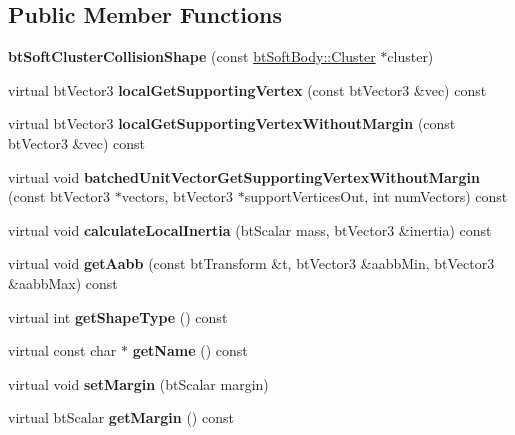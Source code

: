 \subsection*{Public Member Functions}
\begin{DoxyCompactItemize}
\item 
\mbox{\label{classbtSoftClusterCollisionShape_a13945afba7d058ce5838dcc19a5239fb}} 
{\bfseries bt\+Soft\+Cluster\+Collision\+Shape} (const \hyperlink{structbtSoftBody_1_1Cluster}{bt\+Soft\+Body\+::\+Cluster} $\ast$cluster)
\item 
\mbox{\label{classbtSoftClusterCollisionShape_abc8c1607229965355a14808cdb7b6dfa}} 
virtual bt\+Vector3 {\bfseries local\+Get\+Supporting\+Vertex} (const bt\+Vector3 \&vec) const
\item 
\mbox{\label{classbtSoftClusterCollisionShape_a465058b0fd68751b081a06949db51db5}} 
virtual bt\+Vector3 {\bfseries local\+Get\+Supporting\+Vertex\+Without\+Margin} (const bt\+Vector3 \&vec) const
\item 
\mbox{\label{classbtSoftClusterCollisionShape_afc3eb712e569104728cd6ec429e85ea4}} 
virtual void {\bfseries batched\+Unit\+Vector\+Get\+Supporting\+Vertex\+Without\+Margin} (const bt\+Vector3 $\ast$vectors, bt\+Vector3 $\ast$support\+Vertices\+Out, int num\+Vectors) const
\item 
\mbox{\label{classbtSoftClusterCollisionShape_a4073a70e10ba652d8fb3eda9927e5b71}} 
virtual void {\bfseries calculate\+Local\+Inertia} (bt\+Scalar mass, bt\+Vector3 \&inertia) const
\item 
\mbox{\label{classbtSoftClusterCollisionShape_a11e7a93ea606ef2e0482315c7f02021c}} 
virtual void {\bfseries get\+Aabb} (const bt\+Transform \&t, bt\+Vector3 \&aabb\+Min, bt\+Vector3 \&aabb\+Max) const
\item 
\mbox{\label{classbtSoftClusterCollisionShape_a29e87023d4c9fb6e578010225d23f48d}} 
virtual int {\bfseries get\+Shape\+Type} () const
\item 
\mbox{\label{classbtSoftClusterCollisionShape_a573b7fc4bbb432bd11975a50e4a8b595}} 
virtual const char $\ast$ {\bfseries get\+Name} () const
\item 
\mbox{\label{classbtSoftClusterCollisionShape_a0465940b33f7c7023ccd86ffe7b7935d}} 
virtual void {\bfseries set\+Margin} (bt\+Scalar margin)
\item 
\mbox{\label{classbtSoftClusterCollisionShape_a672f0d4c884d785fef4b865270bdf5bd}} 
virtual bt\+Scalar {\bfseries get\+Margin} () const
\end{DoxyCompactItemize}
